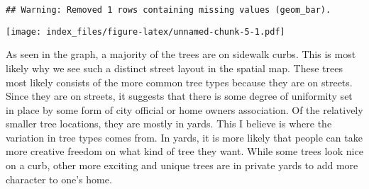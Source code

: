 \documentclass[
]{article}
\newenvironment{Shaded}{\begin{snugshade}}{\end{snugshade}}
\newcommand{\DataTypeTok}[1]{\textcolor[rgb]{0.13,0.29,0.53}{#1}}
\newcommand{\DecValTok}[1]{\textcolor[rgb]{0.00,0.00,0.81}{#1}}
\newcommand{\KeywordTok}[1]{\textcolor[rgb]{0.13,0.29,0.53}{\textbf{#1}}}
\newcommand{\NormalTok}[1]{#1}
\newcommand{\OperatorTok}[1]{\textcolor[rgb]{0.81,0.36,0.00}{\textbf{#1}}}
\newcommand{\StringTok}[1]{\textcolor[rgb]{0.31,0.60,0.02}{#1}}
\begin{document}
\begin{verbatim}
## Warning: Removed 1 rows containing missing values (geom_bar).
\end{verbatim}

\texttt{[image: index\_files/figure-latex/unnamed-chunk-5-1.pdf]}

As seen in the graph, a majority of the trees are on sidewalk curbs.
This is most likely why we see such a distinct street layout in the
spatial map. These trees most likely consists of the more common tree
types because they are on streets. Since they are on streets, it
suggests that there is some degree of uniformity set in place by some
form of city official or home owners association. Of the relatively
smaller tree locations, they are mostly in yards. This I believe is
where the variation in tree types comes from. In yards, it is more
likely that people can take more creative freedom on what kind of tree
they want. While some trees look nice on a curb, other more exciting and
unique trees are in private yards to add more character to one's home.

\begin{Shaded}
\end{Shaded}
\end{document}
